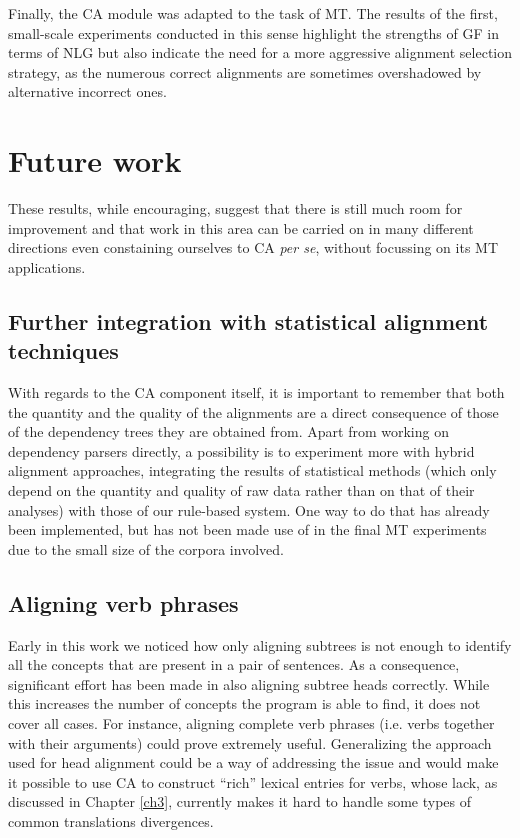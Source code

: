 Finally, the CA module was adapted to the task of MT. The results of the first, small-scale experiments conducted in this sense highlight the strengths of GF in terms of NLG but also indicate the need for a more aggressive alignment selection strategy, as the numerous correct alignments are sometimes overshadowed by alternative incorrect ones. 

\section*{Future work} \label{future}
These results, while encouraging, suggest that there is still much room for improvement and that work in this area can be carried on in many different directions even constaining ourselves to CA \textit{per se}, without focussing on its MT applications. 

\subsection*{Further integration with statistical alignment techniques} 
With regards to the CA component itself, it is important to remember that both the quantity and the quality of the alignments are a direct consequence of those of the dependency trees they are obtained from. Apart from working on dependency parsers directly, a possibility is to experiment more with hybrid alignment approaches, integrating the results of statistical methods (which only depend on the quantity and quality of raw data rather than on that of their analyses) with those of our rule-based system. One way to do that has already been implemented, but has not been made use of in the final MT experiments due to the small size of the corpora involved.

\subsection*{Aligning verb phrases}
Early in this work we noticed how only aligning subtrees is not enough to identify all the concepts that are present in a pair of sentences. As a consequence, significant effort has been made in also aligning subtree heads correctly. While this increases the number of concepts the program is able to find, it does not cover all cases. For instance, aligning complete verb phrases (i.e. verbs together with their arguments) could prove extremely useful. Generalizing the approach used for head alignment could be a way of addressing the issue and would make it possible to use CA to construct ``rich'' lexical entries for verbs, whose lack, as discussed in Chapter \ref{ch3}, currently makes it hard to handle some types of common translations divergences.

